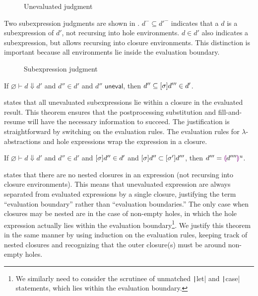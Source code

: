 \begin{figure}
  \centering
  \begin{mdframed}
    \begin{singlespace}
      
    \end{singlespace}
  \end{mdframed}
  \caption{Unevaluated judgment}
  \label{fig:uneval}
\end{figure}

Two subexpression judgments are shown in . $d^-\subseteq d'^-$ indicates that a $d$ is a subexpression of $d'$, not recursing into hole environments. $d\in d'$ also indicates a subexpression, but allows recursing into closure environments. This distinction is important because all environments lie inside the evaluation boundary.

\begin{figure}
  \centering
  \begin{mdframed}
    \begin{singlespace}
      
    \end{singlespace}
  \end{mdframed}
  \caption{Subexpression judgment}
  \label{fig:subexpression}
\end{figure}

\begin{theorem}
  If $\varnothing\vdash d\Downarrow d'$ and $d''\in d'$ and $d''\textsf{ uneval}$, then $d''\subseteq[\sigma]d'''\in d'$.
  \label{thm:eval-boundary-1}
\end{theorem}

 states that all unevaluated subexpressions lie within a closure in the evaluated result. This theorem ensures that the postprocessing substitution and fill-and-resume will have the necessary information to succeed. The justification is straightforward by switching on the evaluation rules. The evaluation rules for $\lambda$-abstractions and hole expressions wrap the expression in a closure.

\begin{theorem}
  If $\varnothing\vdash d\Downarrow d'$ and $d''\in d'$ and $[\sigma]d''\in d'$ and $[\sigma]d''\subset[\sigma']d'''$, then $d'''=\textcolor{violet}{\llparenthesis} d''''\textcolor{violet}{\rrparenthesis}^u$.
  \label{thm:eval-boundary-2}
\end{theorem}

 states that there are no nested closures in an expression (not recursing into closure environments). This means that unevaluated expression are always separated from evaluated expressions by a single closure, justifying the term ``evaluation boundary'' rather than ``evaluation boundaries.'' The only case when closures may be nested are in the case of non-empty holes, in which the hole expression actually lies within the evaluation boundary\footnote{We similarly need to consider the scrutinee of unmatched \texttt|let| and \texttt|case| statements, which lies within the evaluation boundary.}. We justify this theorem in the same manner by using induction on the evaluation rules, keeping track of nested closures and recognizing that the outer closure(s) must be around non-empty holes.

